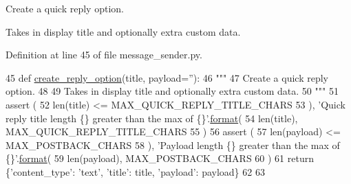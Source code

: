 \begin{DoxyVerb}Create a quick reply option.

Takes in display title and optionally extra custom data.
\end{DoxyVerb}
 

Definition at line 45 of file message\+\_\+sender.\+py.


\begin{DoxyCode}
45 \textcolor{keyword}{def }\hyperlink{namespaceparlai_1_1chat__service_1_1services_1_1messenger_1_1message__sender_a895e006007913ad0fde9c2c9bf9ec5a5}{create\_reply\_option}(title, payload=''):
46     \textcolor{stringliteral}{"""}
47 \textcolor{stringliteral}{    Create a quick reply option.}
48 \textcolor{stringliteral}{}
49 \textcolor{stringliteral}{    Takes in display title and optionally extra custom data.}
50 \textcolor{stringliteral}{    """}
51     \textcolor{keyword}{assert} (
52         len(title) <= MAX\_QUICK\_REPLY\_TITLE\_CHARS
53     ), \textcolor{stringliteral}{'Quick reply title length \{\} greater than the max of \{\}'}.\hyperlink{namespaceparlai_1_1chat__service_1_1services_1_1messenger_1_1shared__utils_a32e2e2022b824fbaf80c747160b52a76}{format}(
54         len(title), MAX\_QUICK\_REPLY\_TITLE\_CHARS
55     )
56     \textcolor{keyword}{assert} (
57         len(payload) <= MAX\_POSTBACK\_CHARS
58     ), \textcolor{stringliteral}{'Payload length \{\} greater than the max of \{\}'}.\hyperlink{namespaceparlai_1_1chat__service_1_1services_1_1messenger_1_1shared__utils_a32e2e2022b824fbaf80c747160b52a76}{format}(
59         len(payload), MAX\_POSTBACK\_CHARS
60     )
61     \textcolor{keywordflow}{return} \{\textcolor{stringliteral}{'content\_type'}: \textcolor{stringliteral}{'text'}, \textcolor{stringliteral}{'title'}: title, \textcolor{stringliteral}{'payload'}: payload\}
62 
63 
\end{DoxyCode}
\mbox{\label{namespaceparlai_1_1chat__service_1_1services_1_1messenger_1_1message__sender_a4c32dfd7947a473a730b81e9356e3513}} 
